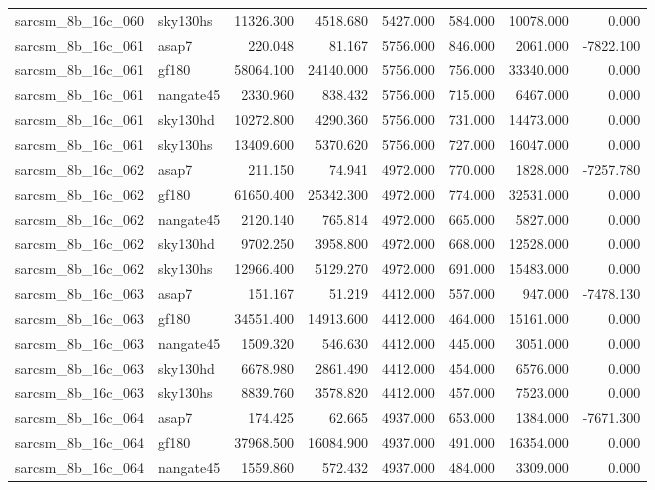 \begin{tabular}{llrrrrrr}
sarcsm\_8b\_16c\_060 & sky130hs & 11326.300 & 4518.680 & 5427.000 & 584.000 & 10078.000 & 0.000 \\
sarcsm\_8b\_16c\_061 & asap7 & 220.048 & 81.167 & 5756.000 & 846.000 & 2061.000 & -7822.100 \\
sarcsm\_8b\_16c\_061 & gf180 & 58064.100 & 24140.000 & 5756.000 & 756.000 & 33340.000 & 0.000 \\
sarcsm\_8b\_16c\_061 & nangate45 & 2330.960 & 838.432 & 5756.000 & 715.000 & 6467.000 & 0.000 \\
sarcsm\_8b\_16c\_061 & sky130hd & 10272.800 & 4290.360 & 5756.000 & 731.000 & 14473.000 & 0.000 \\
sarcsm\_8b\_16c\_061 & sky130hs & 13409.600 & 5370.620 & 5756.000 & 727.000 & 16047.000 & 0.000 \\
sarcsm\_8b\_16c\_062 & asap7 & 211.150 & 74.941 & 4972.000 & 770.000 & 1828.000 & -7257.780 \\
sarcsm\_8b\_16c\_062 & gf180 & 61650.400 & 25342.300 & 4972.000 & 774.000 & 32531.000 & 0.000 \\
sarcsm\_8b\_16c\_062 & nangate45 & 2120.140 & 765.814 & 4972.000 & 665.000 & 5827.000 & 0.000 \\
sarcsm\_8b\_16c\_062 & sky130hd & 9702.250 & 3958.800 & 4972.000 & 668.000 & 12528.000 & 0.000 \\
sarcsm\_8b\_16c\_062 & sky130hs & 12966.400 & 5129.270 & 4972.000 & 691.000 & 15483.000 & 0.000 \\
sarcsm\_8b\_16c\_063 & asap7 & 151.167 & 51.219 & 4412.000 & 557.000 & 947.000 & -7478.130 \\
sarcsm\_8b\_16c\_063 & gf180 & 34551.400 & 14913.600 & 4412.000 & 464.000 & 15161.000 & 0.000 \\
sarcsm\_8b\_16c\_063 & nangate45 & 1509.320 & 546.630 & 4412.000 & 445.000 & 3051.000 & 0.000 \\
sarcsm\_8b\_16c\_063 & sky130hd & 6678.980 & 2861.490 & 4412.000 & 454.000 & 6576.000 & 0.000 \\
sarcsm\_8b\_16c\_063 & sky130hs & 8839.760 & 3578.820 & 4412.000 & 457.000 & 7523.000 & 0.000 \\
sarcsm\_8b\_16c\_064 & asap7 & 174.425 & 62.665 & 4937.000 & 653.000 & 1384.000 & -7671.300 \\
sarcsm\_8b\_16c\_064 & gf180 & 37968.500 & 16084.900 & 4937.000 & 491.000 & 16354.000 & 0.000 \\
sarcsm\_8b\_16c\_064 & nangate45 & 1559.860 & 572.432 & 4937.000 & 484.000 & 3309.000 & 0.000 \\

\end{tabular}
